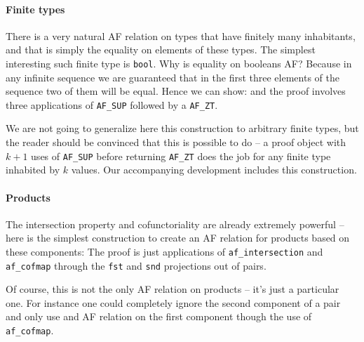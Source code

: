 \documentclass{llncs}
\begin{document}
\paragraph{Finite types}

There is a very natural AF relation on types that have finitely many inhabitants, and that 
is simply the equality on elements of these types. The simplest interesting such finite type
is \lstinline|bool|. Why is equality on booleans AF? Because in any infinite sequence we are 
guaranteed that in the first three elements of the sequence two of them will be equal. Hence
we can show:
and the proof involves three applications of \lstinline|AF_SUP| followed by a \lstinline|AF_ZT|. 

We are not going to generalize here this construction to arbitrary finite types, but the
reader should be convinced that this is possible to do -- a proof object with $k+1$ uses of 
\lstinline|AF_SUP| before returning \lstinline|AF_ZT| does the job for any finite type 
inhabited by $k$ values. Our accompanying development includes this construction. 

\paragraph{Products}
The intersection property and cofunctoriality are already extremely powerful -- here is 
the simplest construction to create an AF relation for products based on these components:
The proof is just applications of \lstinline|af_intersection| and \lstinline|af_cofmap| through
the \lstinline|fst| and \lstinline|snd| projections out of pairs.

Of course, this is not the only AF relation on products -- it's just a particular one. For
instance one could completely ignore the second component of a pair and only use and AF 
relation on the first component though the use of \lstinline|af_cofmap|.

\end{document}
